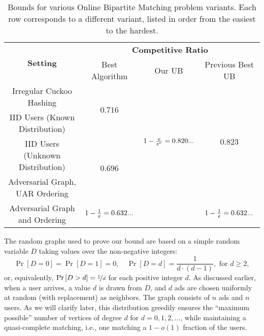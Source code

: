 \documentclass[11pt]{article}
\newcommand{\narrowldots}{\mathinner{\ldotp\!\ldotp\!\ldotp}}
\begin{document}
\begingroup
\renewcommand{\arraystretch}{1.5}
\begin{table}[t]
    \centering
    \small
    \begin{tabular}{|c|c|c|c|}
        \hline
        \multirow{2}{*}{\textbf{Setting}} & \multicolumn{3}{c|}{\textbf{Competitive Ratio}} \\
        \cline{2-4}
        & Best Algorithm & 
        Our UB & Previous Best UB  \\
        \hline
        \hline
        {\footnotesize Irregular Cuckoo Hashing}&\multirow{2}{*}{$0.716$ \cite{hsy22}}  & \multirow{4}{*}{$1 - \frac{e}{e^e} = 0.820\!\narrowldots$} & \multirow{4}{*}{$0.823$ \cite{mos11}}    \\
        \cline{1-1}
        {\footnotesize IID Users (Known Distribution)} & &  & \\
        \cline{1-2}
        {\footnotesize IID Users (Unknown Distribution)} & \multirow{2}{*}{$0.696$ \cite{my11}}&  &  \\
        \cline{1-1}
        {\footnotesize Adversarial Graph, UAR Ordering} &  &  &  \\
        \hline
        \hline
        {\footnotesize Adversarial Graph and Ordering} & $1-\frac1e = 0.632\!\narrowldots$ \cite{kvv90,gm08} & \cellcolor{gray!20} &$1-\frac1e = 0.632\!\narrowldots$ \cite{kvv90}   \\
        \hline
    \end{tabular}
    \caption{Bounds for various Online Bipartite Matching problem variants. Each row corresponds to a different variant, listed in order from the easiest to the hardest. }
    \label{tab:bounds}
\end{table}
\endgroup

\smallskip

The random graphs used to prove our bound are based on a simple random variable \( D \) taking values over the non-negative integers:  
\[
\Pr\left[D=0\right] = \Pr\left[D=1\right] = 0,  \quad \Pr\left[D=d\right] = \frac{1}{d \cdot (d-1)}, \text{ for } d \ge 2,
\]
or, equivalently, $\Pr\left[D > d\right] = \nicefrac1d$ for each positive integer $d$.
As discussed earlier, when a user arrives, a value \( d \) is drawn from \( D \), and \( d \) ads are chosen uniformly at random (with replacement) as neighbors. The graph consists of \( n \) ads and \( n \) users. As we will clarify later, this distribution greedily ensures the ``maximum possible'' number of vertices of degree \( d \) for  \( d = 0,1,2,\ldots \), while maintaining a quasi-complete matching, i.e., one matching a $1-o(1)$ fraction of the users.
\end{document}
